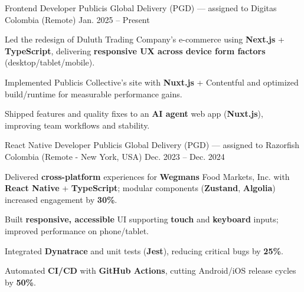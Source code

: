 \newcommand{\quotes}[1]{``#1''}

\begin{cventries}

  \cventry
  {Frontend Developer}
  {Publicis Global Delivery (PGD) — assigned to Digitas}
  {Colombia (Remote)}
  {Jan. 2025 -- Present}
  {
    \begin{cvitems}
      \item {Led the redesign of Duluth Trading Company's e-commerce using \textbf{Next.js} + \textbf{TypeScript}, delivering \textbf{responsive UX across device form factors} (desktop/tablet/mobile).}
      \item {Implemented Publicis Collective's site with \textbf{Nuxt.js} + Contentful and optimized build/runtime for measurable performance gains.}
      \item {Shipped features and quality fixes to an \textbf{AI agent} web app (\textbf{Nuxt.js}), improving team workflows and stability.}
    \end{cvitems}
  }

  \cventry
  {React Native Developer}
  {Publicis Global Delivery (PGD) — assigned to Razorfish}
  {Colombia (Remote - New York, USA)}
  {Dec. 2023 -- Dec. 2024}
  {
    \begin{cvitems}
      \item {Delivered \textbf{cross-platform} experiences for \textbf{Wegmans} Food Markets, Inc. with \textbf{React Native} + \textbf{TypeScript}; modular components (\textbf{Zustand}, \textbf{Algolia}) increased engagement by \textbf{30\%}.}
      \item {Built \textbf{responsive, accessible} UI supporting \textbf{touch} and \textbf{keyboard} inputs; improved performance on phone/tablet.}
      \item {Integrated \textbf{Dynatrace} and unit tests (\textbf{Jest}), reducing critical bugs by \textbf{25\%}.}
      \item {Automated \textbf{CI/CD} with \textbf{GitHub Actions}, cutting Android/iOS release cycles by \textbf{50\%}.}
    \end{cvitems}
  }


\end{cventries}
